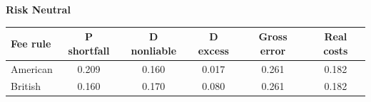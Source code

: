 \documentclass[10pt,border=5pt,varwidth=17cm]{standalone}
\begin{document}
\begingroup
\small
\setlength{\tabcolsep}{5pt}
\renewcommand{\arraystretch}{1.20}
\noindent\textbf{Risk Neutral}\par\smallskip
\noindent\begin{tabularx}{\linewidth}{@{}>{\raggedright\arraybackslash}Xccccc@{}}
\toprule
\textbf{Fee rule} & \textbf{P shortfall} & \textbf{D nonliable} & \textbf{D excess} & \textbf{Gross error} & \textbf{Real costs} \\
\midrule
American & 0.209 & 0.160 & 0.017 & 0.261 & 0.182 \\
British & 0.160 & 0.170 & 0.080 & 0.261 & 0.182 \\
\bottomrule\end{tabularx}\par\medskip
\endgroup
\end{document}
